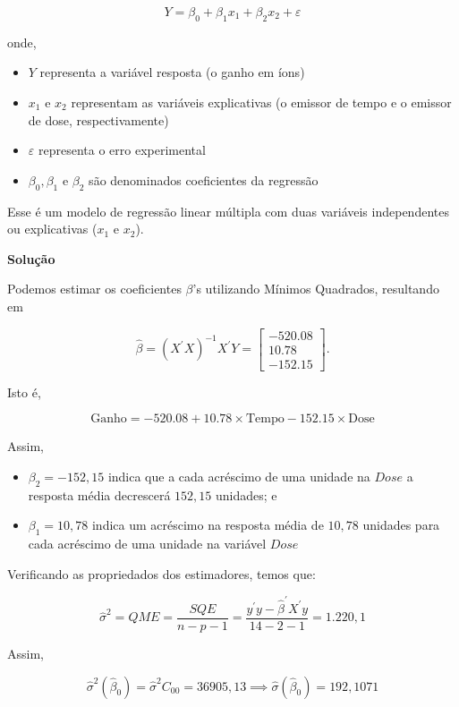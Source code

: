 \documentclass[
]{book}
\providecommand{\tightlist}{%
  \setlength{\itemsep}{0pt}\setlength{\parskip}{0pt}}
\begin{document}
\[Y=\beta_0+\beta_1x_1+\beta_2x_2+\varepsilon\]

onde,

\begin{itemize}
\tightlist
\item
  \(Y\) representa a variável resposta (o ganho em íons)
\item
  \(x_1\) e \(x_2\) representam as variáveis explicativas (o emissor de tempo e o emissor de dose, respectivamente)
\item
  \(\varepsilon\) representa o erro experimental
\item
  \(\beta_0,\beta_1\) e \(\beta_2\) são denominados coeficientes da regressão
\end{itemize}

Esse é um modelo de regressão linear múltipla com duas variáveis independentes ou explicativas (\(x_1\) e \(x_2\)).

\textbf{Solução}

Podemos estimar os coeficientes \(\beta\)'s utilizando Mínimos Quadrados, resultando em

\[\widehat{\beta}=(X^\prime X)^{-1} X^\prime Y=
\begin{bmatrix}-520.08 \\ 10.78 \\ -152.15\end{bmatrix}.\]

Isto é,

\[\text{Ganho}=-520.08+10.78\times\text{Tempo}-152.15\times\text{Dose}\]

Assim,

\begin{itemize}
\tightlist
\item
  \(\beta_2=-152,15\) indica que a cada acréscimo de uma unidade na \(Dose\) a resposta média decrescerá \(152,15\) unidades; e
\item
  \(\beta_1=10,78\) indica um acréscimo na resposta média de \(10,78\) unidades para cada acréscimo de uma unidade na variável \(Dose\)
\end{itemize}

Verificando as propriedados dos estimadores, temos que:

\[\widehat{\sigma}^2= QME = \dfrac{SQE}{n-p-1}=\dfrac{y^\prime y-\widehat{\beta}^\prime X^\prime y}{14-2-1}=1.220,1\]

Assim,

\[\widehat{\sigma}^{2}(\widehat{\beta}_{0})=\widehat{\sigma}^{2}C_{00}=36905,13\implies \widehat{\sigma}(\widehat{\beta}_{0})=192,1071\]
\end{document}
